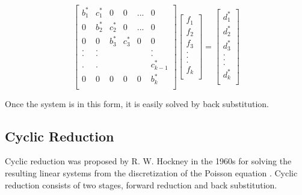 \documentclass[12pt, oneside]{book}
\theoremstyle{plain}
\theoremstyle{definition}
\begin{document}
$$
\begin{bmatrix}  
b^{*}_1 & c^{*}_1 & 0 & 0 & ... & 0 \\ 
0 & b^{*}_2 & c^{*}_2 & 0  & ...  & 0\\ 
0 & 0 & b^{*}_3 & c^{*}_3 & 0 & 0  \\ 
. & . &  &  &  & . \\ 
. & . &  &  &  & . \\ 
. & . &  &  &  & c^{*}_{k-1} \\ 
0 & 0 & 0 & 0 & 0 & b^{*}_k \\ 
\end{bmatrix} \begin{bmatrix}  
f_1 \\ 
f_2 \\ 
f_3 \\ 
.\\ 
.\\ 
.\\ 
f_k \\ 
\end{bmatrix} = \begin{bmatrix} 
d^{*}_1 \\ 
d^{*}_2 \\ 
d^{*}_3 \\ 
.\\ 
.\\ 
.\\ 
d^{*}_k \\ 
\end{bmatrix}
$$

Once the system is in this form, it is easily solved by back substitution.
 

\subsection{Cyclic Reduction}\label{cyclic}
Cyclic reduction was proposed by R. W. Hockney in the 1960s for solving the resulting linear systems from the  discretization of the Poisson equation \cite{Hockney}. Cyclic reduction consists of two stages, forward reduction and back substitution.
\end{document}
